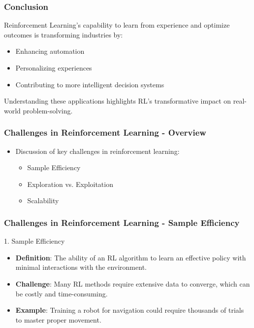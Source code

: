 \documentclass[aspectratio=169]{beamer}
\begin{document}
\begin{frame}[fragile]
    \frametitle{Conclusion}
    Reinforcement Learning's capability to learn from experience and optimize outcomes is transforming industries by:
    \begin{itemize}
        \item Enhancing automation
        \item Personalizing experiences
        \item Contributing to more intelligent decision systems
    \end{itemize}
    Understanding these applications highlights RL's transformative impact on real-world problem-solving.
\end{frame}

\begin{frame}[fragile]
    \frametitle{Challenges in Reinforcement Learning - Overview}
    \begin{itemize}
        \item Discussion of key challenges in reinforcement learning:
        \begin{itemize}
            \item Sample Efficiency
            \item Exploration vs. Exploitation
            \item Scalability
        \end{itemize}
    \end{itemize}
\end{frame}

\begin{frame}[fragile]
    \frametitle{Challenges in Reinforcement Learning - Sample Efficiency}
    \begin{block}{1. Sample Efficiency}
        \begin{itemize}
            \item \textbf{Definition}: The ability of an RL algorithm to learn an effective policy with minimal interactions with the environment.
            \item \textbf{Challenge}: Many RL methods require extensive data to converge, which can be costly and time-consuming.
            \item \textbf{Example}: Training a robot for navigation could require thousands of trials to master proper movement.
        \end{itemize}
    \end{block}
\end{frame}
\end{document}
